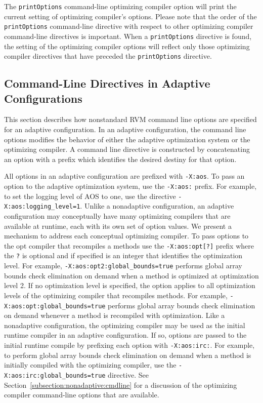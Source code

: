 The {\tt printOptions} command-line optimizing compiler option will print
the current setting of optimizing compiler's options.  Please note that the 
order of the {\tt printOptions} command-line directive with respect to other
optimizing compiler command-line directives is important.  
When a {\tt printOptions} directive is found, the setting of the optimizing 
compiler options will reflect only those optimizing compiler directives
that have preceded the {\tt printOptions} directive.  

\subsection{Command-Line Directives in Adaptive Configurations}
\label{subsection:adaptive:cmdline}

This section describes how nonstandard RVM command line options are 
specified for an adaptive configuration.
In an adaptive configuration, the command line options modifies
the behavior of either the adaptive optimization system or 
the optimizing compiler.
A command line directive is constructed by concatenating an option 
with a prefix which identifies the desired destiny for that option.

All options in an adaptive configuration are prefixed with {\tt -X:aos}.
To pass an option to the adaptive optimization system, use the {\tt -X:aos:} 
prefix. 
For example, to set the logging level of AOS to one, use the directive
{\tt -X:aos:logging\_level=1}.
Unlike a nonadaptive configuration, an adaptive configuration may 
conceptually have many optimizing compilers that are available at runtime,
each with its own set of option values.
We present a mechanism to address each conceptual optimizing compiler.
To pass options to the opt compiler that recompiles a methods
use the {\tt -X:aos:opt[?]} prefix where the {\tt ?} is optional and 
if specified is an integer that identifies the optimization level.
For example, {\tt -X:aos:opt2:global\_bounds=true} performs 
global array bounds check elimination on demand when a method is 
optimized at optimization level 2.
If no optimization level is specified, the option applies to all 
optimization levels of the optimizing compiler that recompiles methods.
For example, {\tt -X:aos:opt:global\_bounds=true} performs 
global array bounds check elimination on demand whenever a method is 
recompiled with optimization.
Like a nonadaptive configuration, the optimizing compiler may be used
as the initial runtime compiler in an adaptive configuration.
If so, options are passed to the initial runtime compile by prefixing
each option with {\tt -X:aos:irc:}.
For example, to perform global array bounds check elimination on demand
when a method is initially compiled with the optimizing compiler,
use the {\tt -X:aos:irc:global\_bounds=true} directive.
See Section~\ref{subsection:nonadaptive:cmdline} for a discussion of the
optimizing compiler command-line options that are available.

